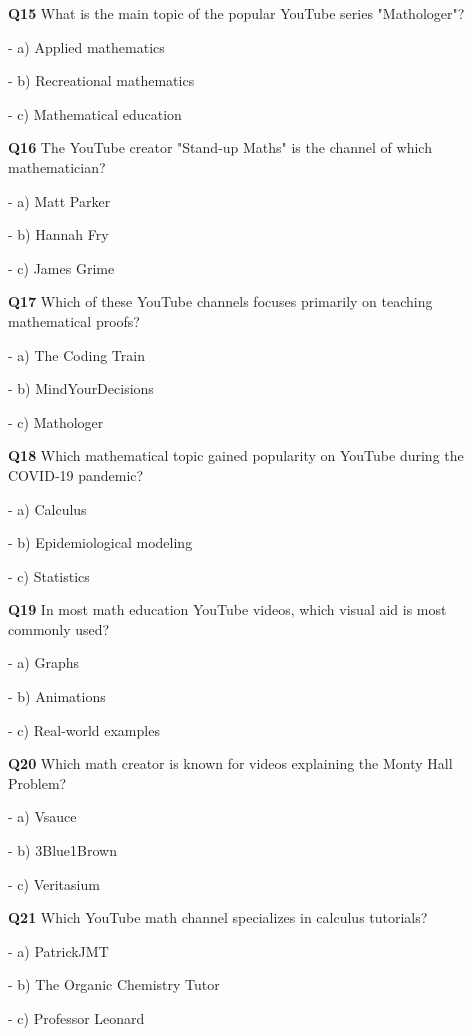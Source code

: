 \textbf{Q15} What is the main topic of the popular YouTube series "Mathologer"?\par
\quad - a) Applied mathematics\par
\quad - b) Recreational mathematics\par
\quad - c) Mathematical education\par

\textbf{Q16} The YouTube creator "Stand‑up Maths" is the channel of which mathematician?\par
\quad - a) Matt Parker\par
\quad - b) Hannah Fry\par
\quad - c) James Grime\par

\textbf{Q17} Which of these YouTube channels focuses primarily on teaching mathematical proofs?\par
\quad - a) The Coding Train\par
\quad - b) MindYourDecisions\par
\quad - c) Mathologer\par

\textbf{Q18} Which mathematical topic gained popularity on YouTube during the COVID‑19 pandemic?\par
\quad - a) Calculus\par
\quad - b) Epidemiological modeling\par
\quad - c) Statistics\par

\textbf{Q19} In most math education YouTube videos, which visual aid is most commonly used?\par
\quad - a) Graphs\par
\quad - b) Animations\par
\quad - c) Real‑world examples\par

\textbf{Q20} Which math creator is known for videos explaining the Monty Hall Problem?\par
\quad - a) Vsauce\par
\quad - b) 3Blue1Brown\par
\quad - c) Veritasium\par

\textbf{Q21} Which YouTube math channel specializes in calculus tutorials?\par
\quad - a) PatrickJMT\par
\quad - b) The Organic Chemistry Tutor\par
\quad - c) Professor Leonard\par

